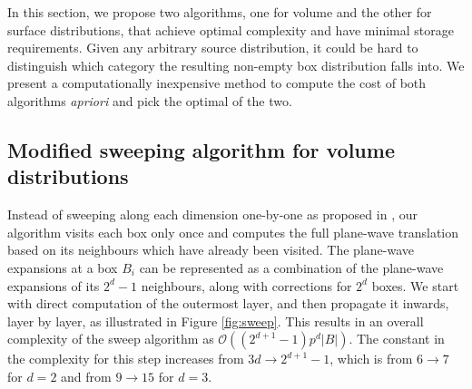 In this section, we propose two algorithms, one for volume and the other for surface distributions, that achieve optimal complexity and have minimal storage requirements. Given any arbitrary source distribution, it could be hard to distinguish which category the resulting non-empty box distribution falls into. We present a computationally inexpensive method to compute the cost of both algorithms {\em apriori} and pick the optimal of the two. 




\subsection{Modified sweeping algorithm for volume distributions} 
\label{sec:sweep}

Instead of sweeping along each dimension one-by-one as proposed 
in \cite{fggt}, our algorithm visits each box only once and computes the full plane-wave
translation based on its neighbours which have already been visited. The
plane-wave expansions at a box $B_i$ can be represented as a combination of the
plane-wave expansions of its $2^{d} -1$ neighbours, along with corrections for
$2^d$ boxes. We start with direct computation of the outermost layer, and then propagate it inwards, layer by layer, as illustrated in Figure \ref{fig:sweep}. This results in an overall complexity of the sweep algorithm as $\mathcal{O}((2^{d+1} -1)p^d|B|)$. The constant in the
complexity for this step increases from $3d\rightarrow2^{d+1} - 1$, which is
from $6\rightarrow7$ for $d=2$ and from $9\rightarrow15$ for $d=3$. 

